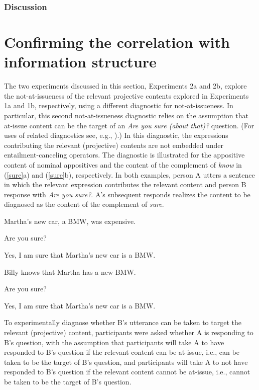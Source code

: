 \documentclass[11pt,fleqn]{article}
\newcommand{\6}{\mbox{$[\hspace*{-.6mm}[$}}
\newcommand{\9}{\mbox{$]\hspace*{-.6mm}]$}}
\begin{document}
\subsubsection{Discussion}

\newpage

\section{Confirming the correlation with information structure}\label{s4}

The two experiments discussed in this section, Experiments 2a and 2b, explore the not-at-issueness of the relevant projective contents explored in Experiments 1a and 1b, respectively, using a different diagnostic for not-at-issueness. In particular, this second not-at-issueness diagnostic relies on the assumption that at-issue content can be the target of an {\em Are you sure (about that)?} question. (For uses of related diagnostics see, e.g., \citealt{tonhauser-sula6}).) In this diagnostic, the expressions contributing the relevant (projective) contents are not embedded under entailment-canceling operators. The diagnostic is illustrated for the appositive content of nominal appositives and the content of the complement of {\em know} in (\ref{sure}a) and (\ref{sure}b), respectively. In both examples, person A utters a sentence in which the relevant expression contributes the relevant content and person B response with {\em Are you sure?}. A's subsequent responds realizes the content to be diagnosed as the content of the complement of {\em sure}. 


\begin{exe}
\ex\label{sure} 
\begin{xlist}
 Martha’s new car, a BMW, was expensive.

 Are you sure?

 Yes, I am sure that Martha's new car is a BMW.
\end{xlist}

\ex 

\begin{xlist}
 Billy knows that Martha has a new BMW.

 Are you sure?

 Yes, I am sure that Martha's new car is a BMW.
\end{xlist}

\end{exe}
To experimentally diagnose whether B's utterance can be taken to target the relevant (projective) content, participants were asked whether A is responding to B's question, with the assumption that participants will take A to have responded to B's question if the relevant content can be at-issue, i.e., can be taken to be the target of B's question, and participants will take A to not have responded to B's question if the relevant content cannot be at-issue, i.e., cannot be taken to be the target of B's question.
\end{document}
